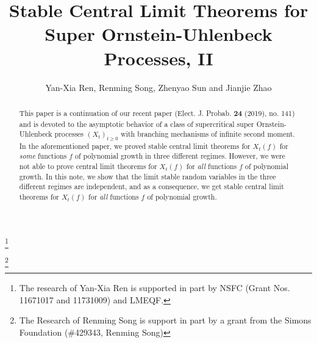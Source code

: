 \documentclass[12pt,a4paper]{amsart}
\theoremstyle{plain}
\theoremstyle{definition}
\numberwithin{equation}{section}
\begin{document}
\title
[stable CLT for super-OU processes]
{Stable Central Limit Theorems for Super Ornstein-Uhlenbeck Processes, II}
\author
[Y.-X. Ren, R. Song, Z. Sun and J. Zhao]
{Yan-Xia Ren, Renming Song, Zhenyao Sun and Jianjie Zhao}
\address{
  Yan-Xia Ren \\
  LMAM School of Mathematical Sciences \& Center for Statistical Science \\
  Peking University \\
  Beijing 100871, P. R. China}
\thanks{The research of Yan-Xia Ren is supported in part by NSFC (Grant Nos. 11671017  and 11731009) and LMEQF.}
\address{
  Renming Song \\
  Department of Mathematics \\
  University of Illinois at Urbana-Champaign \\
  Urbana, IL 61801, USA}
\thanks{The Research of Renming Song is support in part by a grant from the Simons Foundation (\#429343, Renming Song)}
\address{
  Zhenyao Sun \\
  Faculty of Industrial Engineering and Management\\
  Technion, Israel Institute of Technology \\
  Haifa 3200003, Israel}
\address{
  Jianjie Zhao \\
  School of Mathematical Sciences \\
  Peking University \\
  Beijing 100871, P. R. China}

\begin{abstract}
This paper is a continuation of our recent paper (Elect. J. Probab. \textbf{24} (2019), no. 141)
and is devoted to the  asymptotic behavior of a class of supercritical super Ornstein-Uhlenbeck processes $(X_t)_{t\geq 0}$ with branching mechanisms of infinite second moment.
In the aforementioned paper, we proved stable central limit theorems for  $X_t(f) $ for {\it some} functions $f$ of polynomial growth
in three different regimes. However, we were not able to prove 
central limit theorems for
$X_t(f) $ for {\it all} functions $f$ of polynomial growth. 
In this note, we show that the limit stable random variables in the three different regimes are independent, and as a consequence, we get stable central limit theorems for  $X_t(f) $ for {\it all} functions $f$ of polynomial growth.
\end{abstract}
\maketitle
\end{document}
